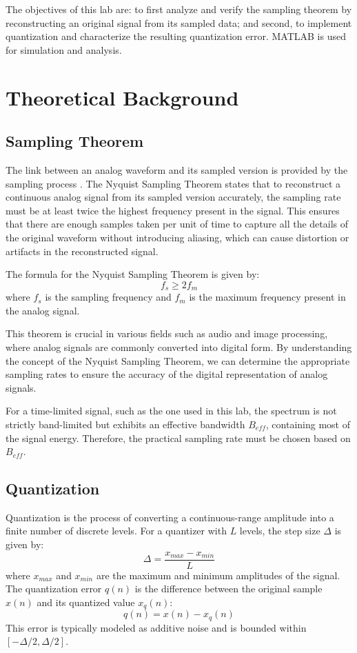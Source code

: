 \documentclass[conference]{IEEEtran}
\begin{document}
The objectives of this lab are: to first analyze and verify the sampling theorem by reconstructing an original signal from its sampled data; and second, to implement quantization and characterize the resulting quantization error. MATLAB is used for simulation and analysis.

\section{Theoretical Background}

\subsection{Sampling Theorem}
The link between an analog waveform and its sampled version is provided by the sampling process \cite{sklar2001digital}.
The Nyquist Sampling Theorem states that to reconstruct a continuous analog signal from its sampled version accurately, the sampling rate must be at least twice the highest frequency present in the signal. This ensures that there are enough samples taken per unit of time to capture all the details of the original waveform without introducing aliasing, which can cause distortion or artifacts in the reconstructed signal.

The formula for the Nyquist Sampling Theorem is given by:
\begin{equation}
f_s \geq 2f_m
\end{equation}
where $f_s$ is the sampling frequency and $f_m$ is the maximum frequency present in the analog signal.

This theorem is crucial in various fields such as audio and image processing, where analog signals are commonly converted into digital form. By understanding the concept of the Nyquist Sampling Theorem, we can determine the appropriate sampling rates to ensure the accuracy of the digital representation of analog signals.

For a time-limited signal, such as the one used in this lab, the spectrum is not strictly band-limited but exhibits an effective bandwidth $B_{eff}$, containing most of the signal energy. Therefore, the practical sampling rate must be chosen based on $B_{eff}$.

\subsection{Quantization}
Quantization is the process of converting a continuous-range amplitude into a finite number of discrete levels. For a quantizer with $L$ levels, the step size $\Delta$ is given by:
\begin{equation}
\Delta = \frac{x_{max} - x_{min}}{L}
\end{equation}
where $x_{max}$ and $x_{min}$ are the maximum and minimum amplitudes of the signal. The quantization error $q(n)$ is the difference between the original sample $x(n)$ and its quantized value $x_q(n)$:
\begin{equation}
q(n) = x(n) - x_q(n)
\end{equation}
This error is typically modeled as additive noise and is bounded within $[-\Delta/2, \Delta/2]$.
\end{document}
